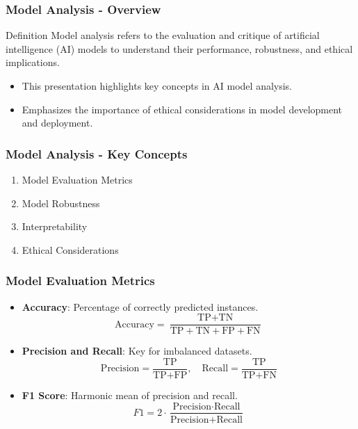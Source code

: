 \documentclass[aspectratio=169]{beamer}
\begin{document}
\begin{frame}[fragile]
    \frametitle{Model Analysis - Overview}
    \begin{block}{Definition}
        Model analysis refers to the evaluation and critique of artificial intelligence (AI) models to understand their performance, robustness, and ethical implications.
    \end{block}
    \begin{itemize}
        \item This presentation highlights key concepts in AI model analysis.
        \item Emphasizes the importance of ethical considerations in model development and deployment.
    \end{itemize}
\end{frame}

\begin{frame}[fragile]
    \frametitle{Model Analysis - Key Concepts}
    \begin{enumerate}
        \item Model Evaluation Metrics
        \item Model Robustness
        \item Interpretability
        \item Ethical Considerations
    \end{enumerate}
\end{frame}

\begin{frame}[fragile]
    \frametitle{Model Evaluation Metrics}
    \begin{itemize}
        \item \textbf{Accuracy}: Percentage of correctly predicted instances.
        \begin{equation}
        \text{Accuracy} = \frac{\text{TP} + \text{TN}}{\text{TP} + \text{TN} + \text{FP} + \text{FN}}
        \end{equation}

        \item \textbf{Precision and Recall}: Key for imbalanced datasets.
        \begin{equation}
        \text{Precision} = \frac{\text{TP}}{\text{TP} + \text{FP}}, \quad \text{Recall} = \frac{\text{TP}}{\text{TP} + \text{FN}}
        \end{equation}

        \item \textbf{F1 Score}: Harmonic mean of precision and recall.
        \begin{equation}
        F1 = 2 \cdot \frac{\text{Precision} \cdot \text{Recall}}{\text{Precision} + \text{Recall}}
        \end{equation}
    \end{itemize}
\end{frame}
\end{document}
